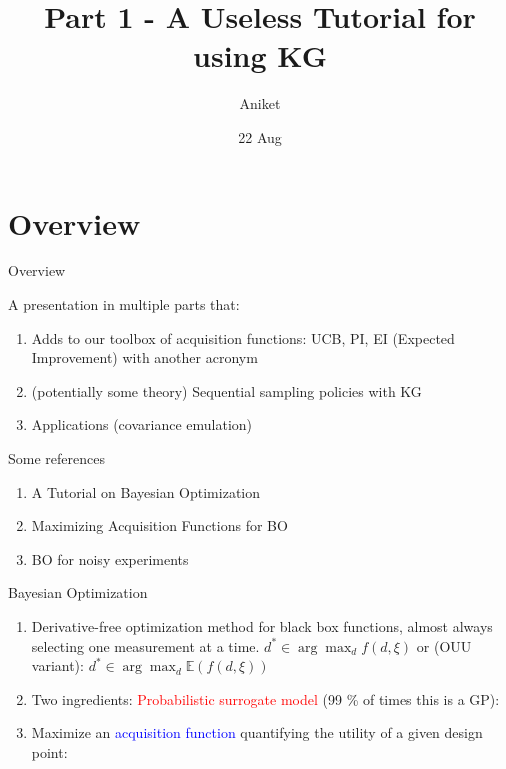 \documentclass[usenames,dvipsnames]{beamer}
\title[Seminar]{Part 1 - A Useless Tutorial for using KG}
\author[AJ]{Aniket}
\institute[U-M]{University of Michigan}
\date{22 Aug}
\theoremstyle{definition}
\let\oldcite=\cite
\renewcommand{\cite}[2][]{\textcolor{blue}{\oldcite[#1]{#2}}}
\begin{document}
\begin{frame}
\titlepage %
\end{frame}



\section{Overview}
\begin{frame}{Overview}

A presentation in multiple parts that:

\begin{enumerate}
    \item Adds to our toolbox of acquisition functions: UCB, PI, EI (Expected Improvement) with another acronym
    
    \item (potentially some theory) Sequential sampling policies with KG
    
    \item Applications (covariance emulation)
\end{enumerate}

\end{frame}

\begin{frame}{Some references}
    \begin{enumerate}
        \item A Tutorial on Bayesian Optimization \cite{frazier_tutorial_2018}
        
        \item Maximizing Acquisition Functions for BO \cite{wilson_maximizing_2018}
        
        \item BO for noisy experiments \cite{letham_constrained_2019}
    \end{enumerate}
\end{frame}

\begin{frame}{Bayesian Optimization}
    \begin{enumerate}
        \item Derivative-free optimization method for black box functions, almost always selecting one measurement at a time.
        $d^\ast \in \arg \max_d f(d, \xi)$ or (OUU variant): $d^\ast \in \arg \max_d \mathbb{E}(f(d, \xi))$
        
        \item Two ingredients: 
        \textcolor{red}{Probabilistic surrogate model} (99 \% of times this is a GP):

        

        \item Maximize an \textcolor{blue}{acquisition function} quantifying the utility of a given design point:
    \end{enumerate}

\end{frame}
\end{document}
